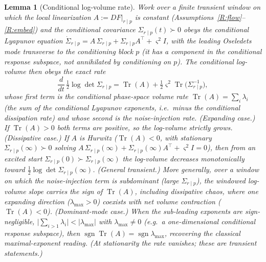 \documentclass[11pt]{article}
\theoremstyle{plain}
\newtheorem{lemma}[theorem]{Lemma}
\theoremstyle{definition}
\theoremstyle{remark}
\newcommand{\Sst}{\Sigma_{r\mid p}(\infty)}
\begin{document}
\begin{lemma}[Conditional log-volume rate]\label{lem:covgrowth}
Work over a finite transient window on which the local linearization $A:=DF|_{r\mid p}$ is constant (Assumptions~\ref{R:flow}--\ref{R:embed}) and the conditional covariance $\Sigma_{r\mid p}(t)\succ0$ obeys the conditional Lyapunov equation $\dot\Sigma_{r\mid p}=A\,\Sigma_{r\mid p}+\Sigma_{r\mid p}A^{\top}+\varsigma^2 I$, with the leading Oseledets mode \emph{transverse to the conditioning block} $p$ (it has a component in the conditional response subspace, not annihilated by conditioning on $p$). The conditional log-volume then obeys the exact rate
\[
\frac{d}{dt}\,\tfrac12\log\det\Sigma_{r\mid p}=\operatorname{Tr}(A)+\tfrac12\varsigma^2\operatorname{Tr}\big(\Sigma_{r\mid p}^{-1}\big),
\]
whose first term is the \emph{conditional phase-space volume rate} $\operatorname{Tr}(A)=\sum_i\lambda_i$ (the sum of the conditional Lyapunov exponents, i.e.\ minus the conditional dissipation rate) and whose second is the noise-injection rate. \emph{(Expanding case.)} If $\operatorname{Tr}(A)>0$ both terms are positive, so the log-volume strictly grows. \emph{(Dissipative case.)} If $A$ is Hurwitz ($\operatorname{Tr}(A)<0$, with stationary $\Sst\succ0$ solving $A\,\Sst+\Sst A^{\top}+\varsigma^2 I=0$), then from an excited start $\Sigma_{r\mid p}(0)\succ\Sst$ the log-volume decreases monotonically toward $\tfrac12\log\det\Sst$. \emph{(General transient.)} More generally, over a window on which the noise-injection term is subdominant (large $\Sigma_{r\mid p}$), the windowed log-volume slope carries the sign of $\operatorname{Tr}(A)$, including dissipative chaos, where one expanding direction ($\lambda_{\max}>0$) coexists with net volume contraction ($\operatorname{Tr}(A)<0$). \emph{(Dominant-mode case.)} When the sub-leading exponents are sign-negligible, $\big|\sum_{i>1}\lambda_i\big|<|\lambda_{\max}|$ with $\lambda_{\max}\neq0$ (e.g.\ a one-dimensional conditional response subspace), then $\operatorname{sgn}\operatorname{Tr}(A)=\operatorname{sgn}\lambda_{\max}$, recovering the classical maximal-exponent reading. (At stationarity the rate vanishes; these are transient statements.)
\end{lemma}
\end{document}
